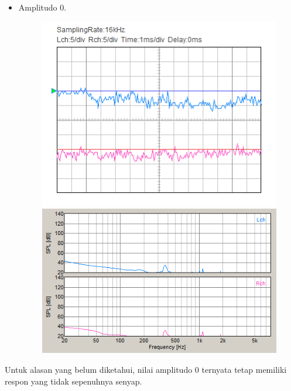 \documentclass[12pt,]{article}
\begin{document}
\begin{itemize}
\begin{itemize}
\begin{itemize}
			\item Amplitudo 0.
			\begin{figure}[H]
				\centering
				\includegraphics[width=0.45\linewidth]{result/day_3/400_Hz/osi_tone0}
				\includegraphics[width=0.45\linewidth]{result/day_3/400_Hz/fft_tone0}
			\end{figure}
		\end{itemize}
		
		Untuk alasan yang belum diketahui, nilai amplitudo 0 ternyata tetap memiliki respon yang tidak sepenuhnya senyap.
		\end{itemize}
	\end{itemize}
		
\end{document}
